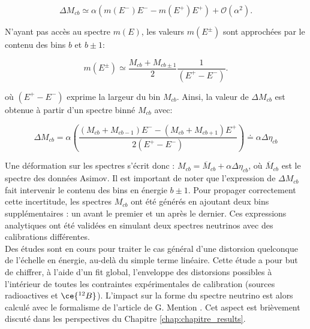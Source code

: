 \begin{equation}
    \Delta M_{cb} \simeq \alpha\left( m(E^-)E^- - m(E^+)E^+ \right) + \mathcal{O}(\alpha^2).
\end{equation}

\bigbreak

N'ayant pas accès au spectre $m(E)$, les valeurs $m(E^\pm)$ sont approchées par le contenu des bins $b$ et $b \pm 1$:

\begin{equation}
    m(E^\pm) \simeq \frac{M_{cb} + M_{cb\pm 1}}{2} \frac{1}{(E^+ - E^-)} .
\end{equation}

\bigbreak

où $(E^+ - E^-)$ exprime la largeur du bin $M_{cb}$. Ainsi, la valeur de $\Delta M_{cb}$ est obtenue à partir d'un spectre binné $M_{cb}$ avec:

\begin{equation}
    \Delta M_{cb} = \alpha \left(\frac{(M_{cb} + M_{cb-1})E^- - (M_{cb} + M_{cb+1})E^+}{2(E^+ - E^-)} \right) \doteq \alpha \Delta \eta_{cb}
\end{equation}

\bigbreak

Une déformation sur les spectres s'écrit donc : $M_{cb} = \overline{M}_{cb} + \alpha \Delta \eta_{cb}$, où $\overline{M}_{cb}$ est le spectre des données Asimov. Il est important de noter que l'expression de $\Delta M_{cb}$ fait intervenir le contenu des bins en énergie $b\pm 1$. Pour propager correctement cette incertitude, les spectres $M_{cb}$ ont été générés en ajoutant deux bins supplémentaires : un avant le premier et un après le dernier. Ces expressions analytiques ont été validées en simulant deux spectres neutrinos avec des calibrations différentes.\\

Des études sont en cours pour traiter le cas général d'une distorsion quelconque de l'échelle en énergie, au-delà du simple terme linéaire. Cette étude a pour but de chiffrer, à l'aide d'un fit global, l'enveloppe des distorsions possibles à l'intérieur de toutes les contraintes expérimentales de calibration (sources radioactives et $\ce{^{12}B}$). L'impact sur la forme du spectre neutrino est alors calculé avec le formalisme de l'article de G. Mention \cite{Mention:2017dyq}. Cet aspect est brièvement discuté dans les perspectives du Chapitre \ref{chap:chapitre_results}.



